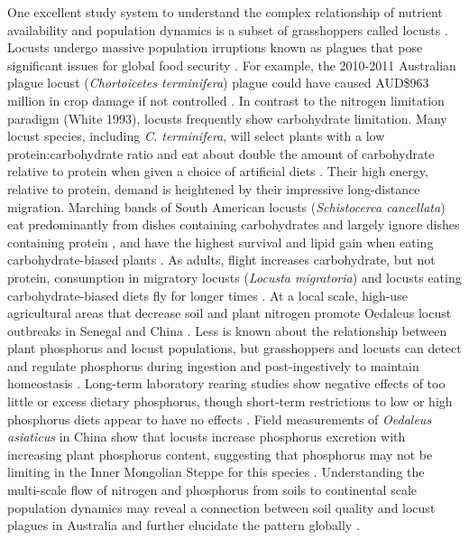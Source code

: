 \documentclass[
]{article}
\begin{document}
One excellent study system to understand the complex relationship of
nutrient availability and population dynamics is a subset of
grasshoppers called locusts
\citep{cullen_molecules_2017, uvarov_grasshoppers_1977}. Locusts undergo
massive population irruptions known as plagues that pose significant
issues for global food security \citep{cease_living_2015}. For example,
the 2010-2011 Australian plague locust (\emph{Chortoicetes terminifera})
plague could have caused AUD\$963 million in crop damage if not
controlled \citep{millist_nicola_benefitcost_nodate}. In contrast to the
nitrogen limitation paradigm (White 1993), locusts frequently show
carbohydrate limitation. Many locust species, including \emph{C.
terminifera}, will select plants with a low protein:carbohydrate ratio
and eat about double the amount of carbohydrate relative to protein when
given a choice of artificial diets
\citep{behmer_insect_2009, brosemann_nutrient_2023, lawton_mismatched_2021, le_gall_global_2019}.
Their high energy, relative to protein, demand is heightened by their
impressive long-distance migration. Marching bands of South American
locusts (\emph{Schistocerca cancellata}) eat predominantly from dishes
containing carbohydrates and largely ignore dishes containing protein
\citep{cease_field_2023}, and have the highest survival and lipid gain
when eating carbohydrate-biased plants \citep{talal_plant_2020}. As
adults, flight increases carbohydrate, but not protein, consumption in
migratory locusts (\emph{Locusta migratoria}) and locusts eating
carbohydrate-biased diets fly for longer times \citep{talal_body_2023}.
At a local scale, high-use agricultural areas that decrease soil and
plant nitrogen promote Oedaleus locust outbreaks in Senegal and China
\citep{cease_heavy_2012, giese_n_2013, le_gall_global_2019, word_soil-targeted_2019}.
Less is known about the relationship between plant phosphorus and locust
populations, but grasshoppers and locusts can detect and regulate
phosphorus during ingestion and post-ingestively to maintain homeostasis
\citep{cease_dietary_2016, zhang_grasshoppers_2014}. Long-term
laboratory rearing studies show negative effects of too little or excess
dietary phosphorus, though short-term restrictions to low or high
phosphorus diets appear to have no effects \citep{cease_dietary_2016}.
Field measurements of \emph{Oedaleus asiaticus} in China show that
locusts increase phosphorus excretion with increasing plant phosphorus
content, suggesting that phosphorus may not be limiting in the Inner
Mongolian Steppe for this species \citep{zhang_grasshoppers_2014}.
Understanding the multi-scale flow of nitrogen and phosphorus from soils
to continental scale population dynamics may reveal a connection between
soil quality and locust plagues in Australia and further elucidate the
pattern globally \citep{cease_how_2024, le_gall_global_2019}.
\end{document}
